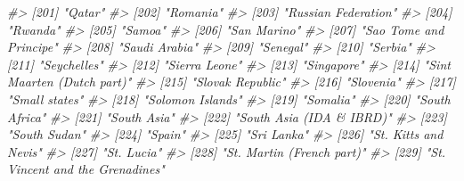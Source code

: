 \documentclass[
  xelatex, ja=standard]{bxjsbook}
\newenvironment{Shaded}{\begin{snugshade}}{\end{snugshade}}
\newcommand{\CommentTok}[1]{\textcolor[rgb]{0.56,0.35,0.01}{\textit{#1}}}
\theoremstyle{definition}
\theoremstyle{definition}
\theoremstyle{definition}
\theoremstyle{definition}
\theoremstyle{remark}
\begin{document}
\begin{Shaded}
\begin{Highlighting}[]
\CommentTok{\#\textgreater{} [201] "Qatar"                                               }
\CommentTok{\#\textgreater{} [202] "Romania"                                             }
\CommentTok{\#\textgreater{} [203] "Russian Federation"                                  }
\CommentTok{\#\textgreater{} [204] "Rwanda"                                              }
\CommentTok{\#\textgreater{} [205] "Samoa"                                               }
\CommentTok{\#\textgreater{} [206] "San Marino"                                          }
\CommentTok{\#\textgreater{} [207] "Sao Tome and Principe"                               }
\CommentTok{\#\textgreater{} [208] "Saudi Arabia"                                        }
\CommentTok{\#\textgreater{} [209] "Senegal"                                             }
\CommentTok{\#\textgreater{} [210] "Serbia"                                              }
\CommentTok{\#\textgreater{} [211] "Seychelles"                                          }
\CommentTok{\#\textgreater{} [212] "Sierra Leone"                                        }
\CommentTok{\#\textgreater{} [213] "Singapore"                                           }
\CommentTok{\#\textgreater{} [214] "Sint Maarten (Dutch part)"                           }
\CommentTok{\#\textgreater{} [215] "Slovak Republic"                                     }
\CommentTok{\#\textgreater{} [216] "Slovenia"                                            }
\CommentTok{\#\textgreater{} [217] "Small states"                                        }
\CommentTok{\#\textgreater{} [218] "Solomon Islands"                                     }
\CommentTok{\#\textgreater{} [219] "Somalia"                                             }
\CommentTok{\#\textgreater{} [220] "South Africa"                                        }
\CommentTok{\#\textgreater{} [221] "South Asia"                                          }
\CommentTok{\#\textgreater{} [222] "South Asia (IDA \& IBRD)"                             }
\CommentTok{\#\textgreater{} [223] "South Sudan"                                         }
\CommentTok{\#\textgreater{} [224] "Spain"                                               }
\CommentTok{\#\textgreater{} [225] "Sri Lanka"                                           }
\CommentTok{\#\textgreater{} [226] "St. Kitts and Nevis"                                 }
\CommentTok{\#\textgreater{} [227] "St. Lucia"                                           }
\CommentTok{\#\textgreater{} [228] "St. Martin (French part)"                            }
\CommentTok{\#\textgreater{} [229] "St. Vincent and the Grenadines"                      }

\end{Highlighting}
\end{Shaded}
\end{document}

